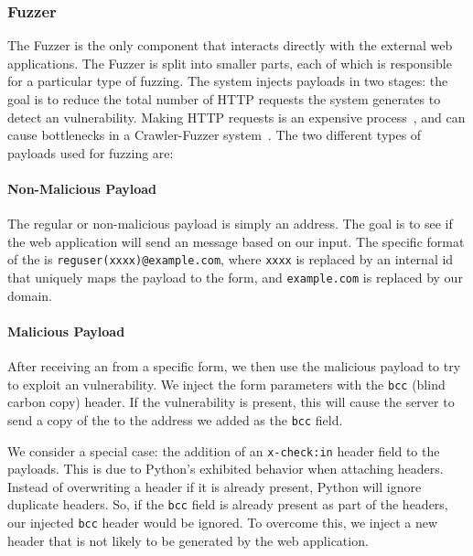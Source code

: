 \subsubsection{Fuzzer}
\label{Comp:Fuzzer}
The Fuzzer is the only component that interacts directly with the external web applications. The Fuzzer is split into smaller parts, each of which is responsible for a particular type of fuzzing.  The system injects payloads in two stages: the goal is to reduce the total number of HTTP requests the system generates to detect an \ehi vulnerability. Making HTTP requests is an expensive process~\cite{httpperf}, and can cause bottlenecks in a Crawler-Fuzzer system~\cite{ShkapenyukTorstenSuel2001}.
The two different types of payloads used for fuzzing are:
\paragraph{Non-Malicious Payload}
\label{Comp:Fuzzer:nmp}
The regular or non-malicious payload is simply an \email address. The goal is to see if the web application will send an \email message based on our input. The specific format of the \email is \texttt{reguser(xxxx)@example.com}, where \texttt{xxxx} is replaced by an internal id that uniquely maps the payload to the form, and \texttt{example.com} is replaced by our domain.

\paragraph{Malicious Payload}
\label{Comp:Fuzzer:mp}
After receiving an \email from a specific form, we then use the malicious payload to try to exploit an \ehi vulnerability. We inject the form parameters with the \texttt{bcc} (blind carbon copy) header. If the vulnerability is present, this will cause the server to send a copy of the \email to the \email address we added as the \texttt{bcc} field.

We consider a special case: the addition of an \texttt{x-check:in} header field to the payloads. This is due to Python's exhibited behavior when attaching
headers. Instead of overwriting a header if it is already present, Python will ignore duplicate headers. So, if the \texttt{bcc} field is already present as part of the headers, our injected \texttt{bcc} header would be ignored. To overcome this, we inject a new header that is not likely to be generated by the web application. 

